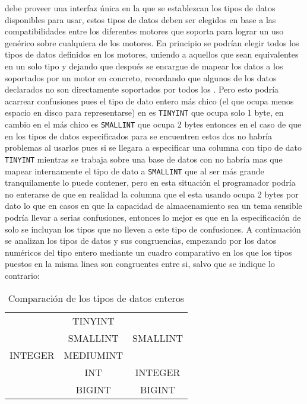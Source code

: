 \jj debe proveer una interfaz única en la que se establezcan los tipos de datos disponibles para usar, estos tipos de datos deben ser elegidos en base a las compatibilidades entre los diferentes motores que soporta para lograr un uso genérico sobre cualquiera de los motores. En principio se podrían elegir todos los tipos de datos definidos en los motores, uniendo a aquellos que sean equivalentes en un solo tipo y dejando que después \jj se encargue de mapear los datos a los soportados por un motor en concreto, recordando que algunos de los datos declarados no son directamente soportados por todos los \dd. Pero esto podría acarrear confusiones pues el tipo de dato entero más chico (el que ocupa menos espacio en disco para representarse) en \m\cite{mysql:datatypes} es \verb=TINYINT= que ocupa solo 1 byte, en cambio en \p\cite{postgre:datatypes} el más chico es \verb=SMALLINT= que ocupa 2 bytes entonces en el caso de que en los tipos de datos especificados para \jj se encuentren estos dos no habría problemas al usarlos pues si se llegara a especificar una columna con tipo de dato \verb=TINYINT= mientras se trabaja sobre una base de datos con \p no habría mas que mapear internamente el tipo de dato a \verb=SMALLINT= que al ser más grande tranquilamente lo puede contener, pero en esta situación el programador podría no enterarse de que en realidad la columna que el esta usando ocupa 2 bytes por dato lo que en casos en que  la capacidad  de almacenamiento sea un tema sensible podría llevar a serias confusiones, entonces lo mejor es que en la especificación de \jj solo se incluyan los tipos que no lleven a este tipo de confusiones. A continuación se analizan los tipos de datos y sus congruencias, empezando por los datos numéricos del tipo entero mediante un cuadro comparativo en los que los tipos puestos en la misma linea son congruentes entre si, salvo que se indique lo contrario:
%        
\begin{table}[h]
\begin{center}
\begin{tabular}{|c|c|c|}
\hline \s      & \m        & \p \\ 
\hline         & TINYINT   &  \\ 
               & SMALLINT  & SMALLINT \\ 
       INTEGER & MEDIUMINT &  \\
               & INT       & INTEGER \\
               & BIGINT    & BIGINT \\  
\hline 
\end{tabular} 
\end{center}
\caption{Comparación de los tipos de datos enteros}
\end{table}
%

